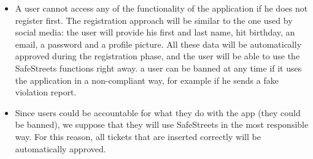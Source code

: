 \begin{itemize}
    \item A user cannot access any of the functionality of the application if he does not register first.
        The registration approach will be similar to the one used by social media: the user will provide his first and last name, hit birthday, an email, a password and a profile picture.
        All these data will be automatically approved during the registration phase, and the user will be able to use the SafeStreets functions right away.
        a user can be banned at any time if it uses the application in a non-compliant way, for example if he sends a fake violation report.
    \item Since users could be accountable for what they do with the app (they could be banned), we suppose that they will use SafeStreets
        in the most responsible way. For this reason, all tickets that are inserted correctly will be automatically approved.
\end{itemize}